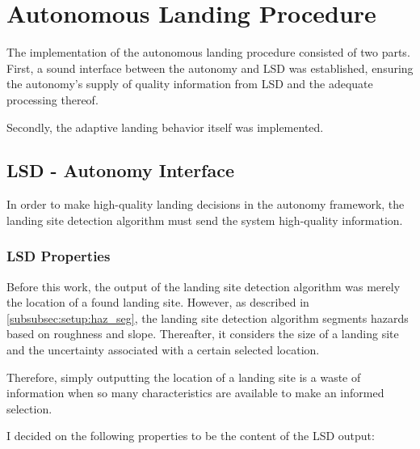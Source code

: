 \chapter{Autonomous Landing Procedure}\label{chapter:autonomous_landing_procedure}

The implementation of the autonomous landing procedure consisted of two parts. First, a sound interface between the autonomy and LSD was established, ensuring the autonomy's supply of quality information from LSD and the adequate processing thereof. 

Secondly, the adaptive landing behavior itself was implemented.

\section{LSD - Autonomy Interface}\label{subsubsec:lsd_autonomy_interface}

In order to make high-quality landing decisions in the autonomy framework, the landing site detection algorithm must send the system high-quality information.

\subsection{LSD Properties}\label{sec:LSproperties}

Before this work, the output of the landing site detection algorithm was merely the location of a found landing site. However, as described in \cref{subsubsec:setup:haz_seg}, the landing site detection algorithm segments hazards based on roughness and slope. Thereafter, it considers the size of a landing site and the uncertainty associated with a certain selected location. 

Therefore, simply outputting the location of a landing site is a waste of information when so many characteristics are available to make an informed selection. 

I decided on the following properties to be the content of the LSD output:

